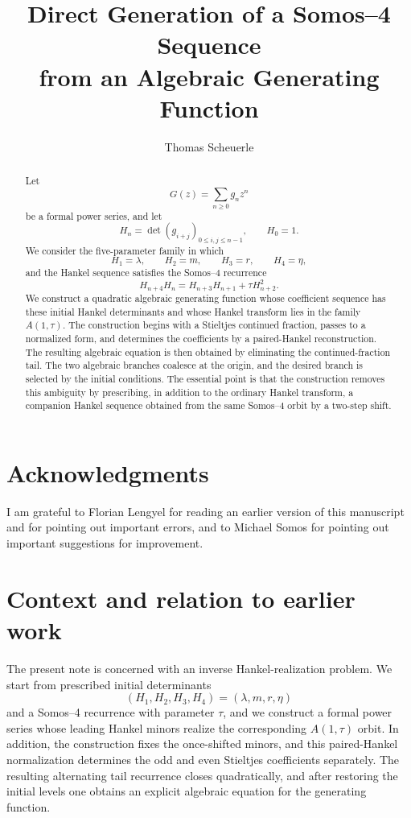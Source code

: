 \documentclass[11pt]{article}
\title{Direct Generation of a Somos--4 Sequence\\
from an Algebraic Generating Function}
\author{Thomas Scheuerle}
\date{}
\theoremstyle{remark}
\begin{document}
\maketitle

\begin{abstract}
Let
\[
G(z)=\sum_{n\ge 0} g_n z^n
\]
be a formal power series, and let
\[
H_n=\det(g_{i+j})_{0\le i,j\le n-1},\qquad H_0=1.
\]
We consider the five-parameter family in which
\[
H_1=\lambda,\qquad H_2=m,\qquad H_3=r,\qquad H_4=\eta,
\]
and the Hankel sequence satisfies the Somos--4 recurrence
\[
H_{n+4}H_n=H_{n+3}H_{n+1}+\tau H_{n+2}^2.
\]
We construct a quadratic algebraic generating function whose coefficient
sequence has these initial Hankel determinants and whose Hankel transform lies
in the family $A(1,\tau)$.  The construction begins with a Stieltjes
continued fraction, passes to a normalized form, and determines the
coefficients by a paired-Hankel reconstruction.  The resulting algebraic
equation is then obtained by eliminating the continued-fraction tail.  The
two algebraic branches coalesce at the origin, and the desired branch is
selected by the initial conditions. The essential point is that the construction removes this ambiguity by
prescribing, in addition to the ordinary Hankel transform, a companion Hankel
sequence obtained from the same Somos--4 orbit by a two-step shift.
\end{abstract}

\section*{Acknowledgments}
I am grateful to Florian Lengyel for reading an earlier version of this manuscript and for pointing out important errors, and to Michael Somos for pointing out important suggestions for improvement.


\section{Context and relation to earlier work}
The present note is concerned with an inverse Hankel-realization problem.  We
start from prescribed initial determinants
\[
(H_1,H_2,H_3,H_4)=(\lambda,m,r,\eta)
\]
and a Somos--4 recurrence with parameter $\tau$, and we construct a formal
power series whose leading Hankel minors realize the corresponding
$A(1,\tau)$ orbit.  In addition, the construction fixes the once-shifted
minors, and this paired-Hankel normalization determines the odd and even
Stieltjes coefficients separately.  The resulting alternating tail recurrence
closes quadratically, and after restoring the initial levels one obtains an
explicit algebraic equation for the generating function.
\end{document}
